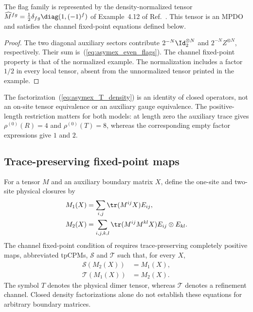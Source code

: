 \begin{lemma}
    \label{thm:asymex_flag_rfp}
    \leanok
    The flag family is represented by the density-normalized tensor
    $\widehat M^{fg}=\tfrac12\delta_{fg}\diag(1,(-1)^f)$ of
    Example~4.12 of Ref.~\cite{Cirac2016MPDO_arXiv}.
    This tensor is an MPDO and satisfies the channel fixed-point
    equations defined below.
\end{lemma}
\begin{proof}
    \leanok
    The two diagonal auxiliary sectors contribute
    $2^{-N}\Id_2^{\otimes N}$ and $2^{-N}Z^{\otimes N}$, respectively.
    Their sum is~(\ref{eq:asymex_even_flags}). The channel fixed-point
    property is that of the normalized example. The normalization
    includes a factor $1/2$ in every local tensor, absent from the
    unnormalized tensor printed in the example.
\end{proof}

The factorization~(\ref{eq:asymex_T_density}) is an identity of closed
operators, not an on-site tensor equivalence or an auxiliary gauge
equivalence. The positive-length restriction matters for both models:
at length zero the auxiliary trace gives $\rho^{(0)}(R)=4$ and
$\rho^{(0)}(T)=8$, whereas the corresponding empty factor expressions
give $1$ and $2$.

\subsection{Trace-preserving fixed-point maps}

For a tensor $M$ and an auxiliary boundary matrix $X$, define the
one-site and two-site physical closures by
\begin{align}
    M_1(X) & =\sum_{i,j}\tr(M^{ij}X)E_{ij}, \nonumber               \\
    M_2(X) & =\sum_{i,j,k,l}\tr(M^{ij}M^{kl}X)E_{ij}\otimes E_{kl}.
    \label{eq:asymex_boundary_closures}
\end{align}
The channel fixed-point condition of
\cite[Definition~4.1]{Cirac2016MPDO_arXiv} requires trace-preserving
completely positive maps, abbreviated tpCPMs, $\mathcal S$ and
$\mathcal T$ such that, for every $X$,
\begin{align}
    \mathcal S(M_2(X)) & =M_1(X), \nonumber \\
    \mathcal T(M_1(X)) & =M_2(X).
    \label{eq:asymex_channel_equations}
\end{align}
The symbol $T$ denotes the physical dimer tensor, whereas $\mathcal T$
denotes a refinement channel. Closed density factorizations alone do
not establish these equations for arbitrary boundary matrices.


